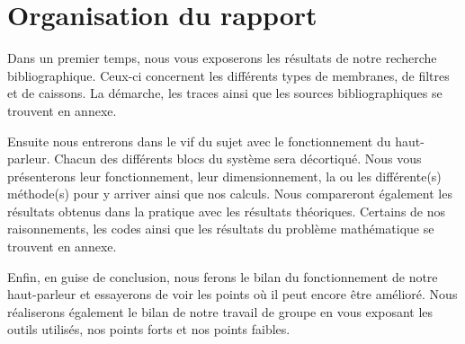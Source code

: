\section{Organisation du rapport}

Dans un premier temps, nous vous exposerons les résultats de notre recherche bibliographique. Ceux-ci concernent 
les différents types de membranes, de filtres et de caissons. La démarche, les traces ainsi que les sources 
bibliographiques se trouvent en annexe.

Ensuite nous entrerons dans le vif du sujet avec le fonctionnement du haut-parleur. Chacun des différents blocs du 
système sera décortiqué. Nous vous présenterons leur fonctionnement, leur dimensionnement, la ou les différente(s) 
méthode(s) pour y arriver ainsi que nos calculs. Nous compareront également les résultats obtenus dans la pratique 
avec les résultats théoriques. Certains de nos raisonnements, les codes ainsi que les résultats du problème 
mathématique se trouvent en annexe.

Enfin, en guise de conclusion, nous ferons le bilan du fonctionnement de notre haut-parleur et essayerons de 
voir les points où il peut encore être amélioré. Nous réaliserons également le bilan de notre travail de groupe 
en vous exposant les outils utilisés, nos points forts et nos points faibles.